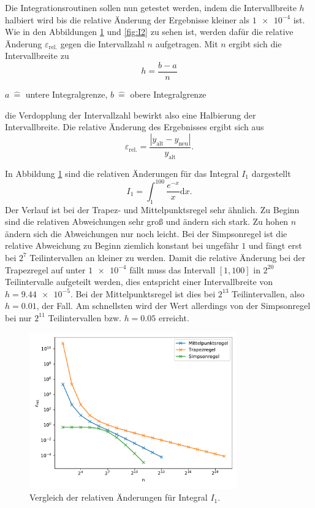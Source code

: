 Die Integrationsroutinen sollen nun getestet werden, indem die Intervallbreite \(h\) halbiert wird bis die relative Änderung der Ergebnisse kleiner als \(\num{1e-4}\) ist.
Wie in den Abbildungen \ref{fig:I1} und \ref{fig:I2} zu sehen ist, werden dafür die relative Änderung \(\varepsilon_\text{rel.}\) gegen die Intervallzahl \(n\) aufgetragen.
Mit \(n\) ergibt sich die Intervallbreite zu
\begin{equation*}
  h = \frac{b-a}{n}
\end{equation*}
\begin{center}
  \tiny{\(a \: \hat{=}\) untere Integralgrenze, \(b \: \hat{=}\) obere Integralgrenze}
\end{center}
die Verdopplung der Intervallzahl bewirkt also eine Halbierung der Intervallbreite.
Die relative Änderung des Ergebnisses ergibt sich aus
\begin{equation*}
  \varepsilon_\text{rel.} = \frac{\left|y_\text{alt} - y_\text{neu} \right|}{y_\text{alt}}.
\end{equation*}

In Abbildung \ref{fig:I1} sind die relativen Änderungen für das Integral \(I_1\) dargestellt
\begin{equation*}
  I_1 = \int_1^{100} \frac{e^{-x}}{x} \mathrm{d}x.
\end{equation*}
Der Verlauf ist bei der Trapez- und Mittelpunktsregel sehr ähnlich. Zu Beginn sind die relativen Abweichungen sehr groß und ändern sich stark. Zu hohen \(n\) ändern sich die Abweichungen nur noch leicht.
Bei der Simpsonregel ist die relative Abweichung zu Beginn ziemlich konstant bei ungefähr \(1\) und fängt erst bei \(2^7\) Teilintervallen an kleiner zu werden.
Damit die relative Änderung bei der Trapezregel auf unter \(\num{1e-4}\) fällt muss das Intervall \([1,100]\) in \(2^{20}\) Teilintervalle aufgeteilt werden, dies entspricht einer Intervallbreite von \(h=\num{9,44e-5}\).
Bei der Mittelpunktsregel ist dies bei \(2^{13}\) Teilintervallen, also \(h=\num{0,01}\), der Fall.
Am schnellsten wird der Wert allerdings von der Simpsonregel bei nur \(2^{11}\) Teilintervallen bzw. \(h=\num{0,05}\) erreicht.

\begin{figure}
  \includegraphics[width=0.8\textwidth]{A3/build/I1.pdf}
  \caption{Vergleich der relativen Änderungen für Integral \(I_1\).}
  \label{fig:I1}
\end{figure}

